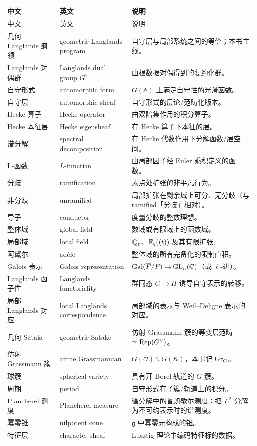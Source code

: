 \begin{longtable}{p{}p{}p{}}
\toprule
中文 & 英文 & 说明\\
\midrule
\endfirsthead
\toprule
中文 & 英文 & 说明\\
\midrule
\endhead
几何 Langlands 纲领 & geometric Langlands program & 自守层与局部系统之间的等价；本书主线。\\
Langlands 对偶群 & Langlands dual group $G^{\vee}$ & 由根数据对偶得到的复约化群。\\
自守形式 & automorphic form & $G(\mathbb{A})$ 上满足自守性的光滑函数。\\
自守层 & automorphic sheaf & 自守形式的层论/范畴化版本。\\
Hecke 算子 & Hecke operator & 由双陪集作用的积分算子。\\
Hecke 本征层 & Hecke eigensheaf & 在 Hecke 算子下本征的层。\\
谱分解 & spectral decomposition & 在 Hecke 代数作用下分解函数/层空间。\\
L-函数 & $L$-function & 由局部因子经 Euler 乘积定义的函数。\\
分歧 & ramification & 素点处扩张的非平凡行为。\\
非分歧 & unramified & 局部扩张在剩余域上可分、无分歧（与 ramified「分歧」相对）。\\
导子 & conductor & 度量分歧的整数理想。\\
整体域 & global field & 数域或有限域上的函数域。\\
局部域 & local field & $\mathbb{Q}_p$、$\mathbb{F}_q((t))$ 及其有限扩张。\\
阿黛尔 & ad\`ele & 整体域的所有完备化的限制直积。\\
Galois 表示 & Galois representation & $\mathrm{Gal}(\overline{F}/F)\to\mathrm{GL}_n(\mathbb{C})$（或 $\ell$-进）。\\
Langlands 函子性 & Langlands functoriality & 群同态 $G\to H$ 诱导自守表示的转移。\\
局部 Langlands 对应 & local Langlands correspondence & 局部域的表示与 Weil--Deligne 表示的对应。\\
几何 Satake & geometric Satake & 仿射 Grassmann 簇的等变层范畴 $\simeq\mathrm{Rep}(G^{\vee})$。\\
仿射 Grassmann 簇 & affine Grassmannian & $G(\mathcal{O})\backslash G(K)$，本书记 $\mathrm{Gr}_G$。\\
球簇 & spherical variety & 具有开 Borel 轨道的 $G$-簇。\\
周期 & period & 自守形式在子簇/轨道上的积分。\\
Plancherel 测度 & Plancherel measure & 谱分解中的普朗歇尔测度：把 $L^2$ 分解为不可约表示时的谱测度。\\
幂零锥 & nilpotent cone & $\mathfrak{g}$ 中幂零元构成的锥。\\
特征层 & character sheaf & Lusztig 理论中编码特征标的数据。\\
\bottomrule
\end{longtable}


